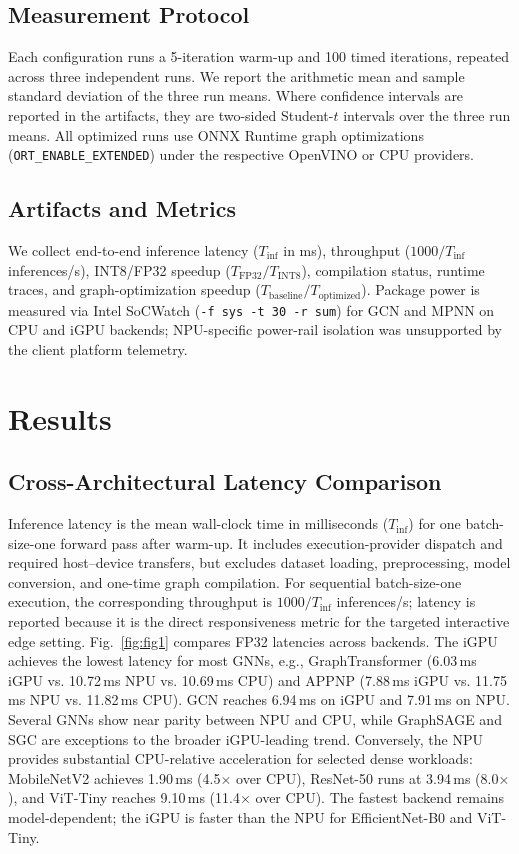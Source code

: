 \documentclass[conference]{IEEEtran}
\begin{document}
\subsection{Measurement Protocol}
Each configuration runs a 5-iteration warm-up and 100 timed iterations, repeated across three independent runs. We report the arithmetic mean and sample standard deviation of the three run means. Where confidence intervals are reported in the artifacts, they are two-sided Student-$t$ intervals over the three run means. All optimized runs use ONNX Runtime graph optimizations (\texttt{ORT\_ENABLE\_EXTENDED}) under the respective OpenVINO or CPU providers.

\subsection{Artifacts and Metrics}
We collect end-to-end inference latency ($T_{\text{inf}}$ in ms), throughput ($1000 / T_{\text{inf}}$ inferences/s), INT8/FP32 speedup ($T_{\text{FP32}} / T_{\text{INT8}}$), compilation status, runtime traces, and graph-optimization speedup ($T_{\text{baseline}} / T_{\text{optimized}}$). Package power is measured via Intel SoCWatch (\texttt{-f sys -t 30 -r sum}) for GCN and MPNN on CPU and iGPU backends; NPU-specific power-rail isolation was unsupported by the client platform telemetry.

\section{Results}

\subsection{Cross-Architectural Latency Comparison}
Inference latency is the mean wall-clock time in milliseconds ($T_{\text{inf}}$) for one batch-size-one forward pass after warm-up. It includes execution-provider dispatch and required host--device transfers, but excludes dataset loading, preprocessing, model conversion, and one-time graph compilation. For sequential batch-size-one execution, the corresponding throughput is $1000/T_{\text{inf}}$ inferences/s; latency is reported because it is the direct responsiveness metric for the targeted interactive edge setting. Fig.~\ref{fig:fig1} compares FP32 latencies across backends. The iGPU achieves the lowest latency for most GNNs, e.g., GraphTransformer (6.03\,ms iGPU vs. 10.72\,ms NPU vs. 10.69\,ms CPU) and APPNP (7.88\,ms iGPU vs. 11.75\,ms NPU vs. 11.82\,ms CPU). GCN reaches 6.94\,ms on iGPU and 7.91\,ms on NPU. Several GNNs show near parity between NPU and CPU, while GraphSAGE and SGC are exceptions to the broader iGPU-leading trend.
Conversely, the NPU provides substantial CPU-relative acceleration for selected dense workloads: MobileNetV2 achieves 1.90\,ms (4.5$\times$ over CPU), ResNet-50 runs at 3.94\,ms (8.0$\times$), and ViT-Tiny reaches 9.10\,ms (11.4$\times$ over CPU). The fastest backend remains model-dependent; the iGPU is faster than the NPU for EfficientNet-B0 and ViT-Tiny.
\end{document}
